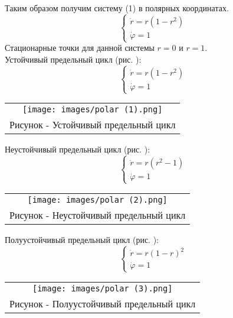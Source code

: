 Таким образом получим систему (1) в полярных координатах.
\begin{equation}
  \begin{cases}
    \dot{r}=r(1-r^2)\\
    \dot{\varphi}=1
  \end{cases}
\end{equation}
Стационарные точки для данной системы $r=0$ и $r=1$.\\
Устойчивый предельный цикл (рис. ):
\begin{equation}
  \begin{cases}
    \dot{r}=r(1-r^2)\\
    \dot{\varphi}=1
  \end{cases}
\end{equation}

\begin{center}
  \begin{tabular}{c}
    \texttt{[image: images/polar (1).png]}\\
    Рисунок  - Устойчивый предельный цикл
  \end{tabular}
\end{center}

Неустойчивый предельный цикл (рис. ):
\begin{equation}
  \begin{cases}
    \dot{r}=r(r^2-1)\\
    \dot{\varphi}=1
  \end{cases}
\end{equation}

\begin{center}
  \begin{tabular}{c}
    \texttt{[image: images/polar (2).png]}\\
    Рисунок  - Неустойчивый предельный цикл
  \end{tabular}
\end{center}

Полуустойчивый предельный цикл (рис. ):
\begin{equation}
  \begin{cases}
    \dot{r}=r(1-r)^2\\
    \dot{\varphi}=1
  \end{cases}
\end{equation}

\begin{center}
  \begin{tabular}{c}
    \texttt{[image: images/polar (3).png]}\\
    Рисунок  - Полуустойчивый предельный цикл
  \end{tabular}
\end{center}

